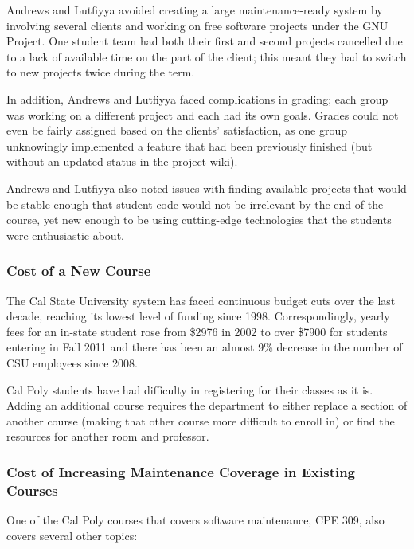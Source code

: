 \documentclass[11pt]{article}
\begin{document}
\begin{multicols}{2}
Andrews and Lutfiyya avoided creating a large maintenance-ready system by involving several clients and working on free software projects under the GNU Project.  One student team had both their first and second projects cancelled due to a lack of available time on the part of the client; this meant they had to switch to new projects twice during the term. \cite{andrews}

In addition, Andrews and Lutfiyya faced complications in grading; each group was working on a different project and each had its own goals. \cite{andrews}  Grades could not even be fairly assigned based on the clients' satisfaction, as one group unknowingly implemented a feature that had been previously finished (but without an updated status in the project wiki). \cite{andrews}

Andrews and Lutfiyya also noted issues with finding available projects that would be stable enough that student code would not be irrelevant by the end of the course, yet new enough to be using cutting-edge technologies that the students were enthusiastic about. \cite{andrews}


\subsubsection{Cost of a New Course}

The Cal State University system has faced continuous budget cuts over the last decade, reaching its lowest level of funding since 1998. \cite{tuitonFall}  Correspondingly, yearly fees for an in-state student rose from \$2976 in 2002 to over \$7900 for students entering in Fall 2011 \cite{feeHistory} and there has been an almost 9\% decrease in the number of CSU employees since 2008. \cite{tuitonFall}

Cal Poly students have had difficulty in registering for their classes as it is. \cite{scramble}  Adding an additional course requires the department to either replace a section of another course (making that other course more difficult to enroll in) or find the resources for another room and professor.

\subsubsection{Cost of Increasing Maintenance Coverage in Existing Courses}

One of the Cal Poly courses that covers software maintenance, CPE 309, also covers several other topics:


\end{multicols}
\end{document}
